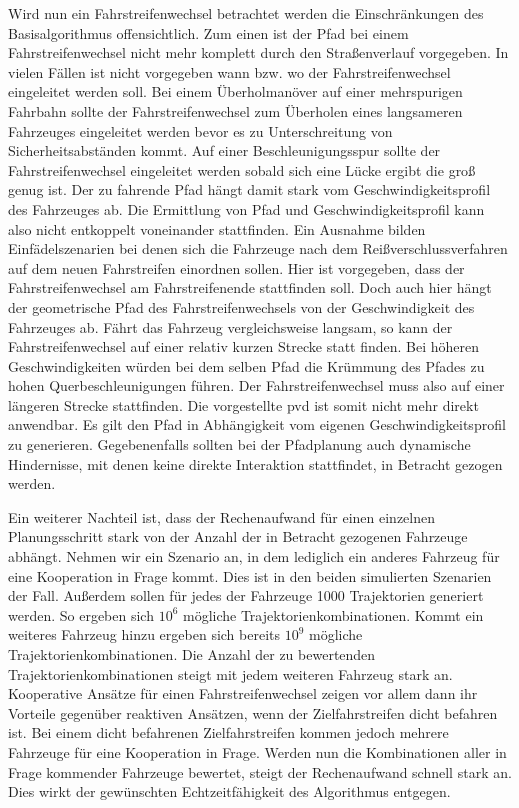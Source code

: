 Wird nun ein Fahrstreifenwechsel betrachtet werden die Einschr\"ankungen des Basisalgorithmus offensichtlich.
Zum einen ist der Pfad bei einem Fahrstreifenwechsel nicht mehr komplett durch den Stra{\ss}enverlauf vorgegeben.
In vielen F\"allen ist nicht vorgegeben wann bzw. wo der Fahrstreifenwechsel eingeleitet werden soll.
Bei einem \"Uberholman\"over auf einer mehrspurigen Fahrbahn sollte der Fahrstreifenwechsel zum \"Uberholen eines langsameren Fahrzeuges eingeleitet werden bevor es zu Unterschreitung von Sicherheitsabst\"anden kommt.
Auf einer Beschleunigungsspur sollte der Fahrstreifenwechsel eingeleitet werden sobald sich eine L\"ucke ergibt die gro{\ss} genug ist.
Der zu fahrende Pfad h\"angt damit stark vom Geschwindigkeitsprofil des Fahrzeuges ab.
Die Ermittlung von Pfad und Geschwindigkeitsprofil kann also nicht entkoppelt voneinander stattfinden.
Ein Ausnahme bilden Einf\"adelszenarien bei denen sich die Fahrzeuge nach dem Rei{\ss}verschlussverfahren auf dem neuen Fahrstreifen einordnen sollen.
Hier ist vorgegeben, dass der Fahrstreifenwechsel am Fahrstreifenende stattfinden soll.
Doch auch hier h\"angt der geometrische Pfad des Fahrstreifenwechsels von der Geschwindigkeit des Fahrzeuges ab.
F\"ahrt das Fahrzeug vergleichsweise langsam, so kann der Fahrstreifenwechsel auf einer relativ kurzen Strecke statt finden.
Bei h\"oheren Geschwindigkeiten w\"urden bei dem selben Pfad die Kr\"ummung des Pfades zu hohen Querbeschleunigungen f\"uhren.
Der Fahrstreifenwechsel muss also auf einer l\"angeren Strecke stattfinden.
Die vorgestellte \gls{pvd} ist somit nicht mehr direkt anwendbar.
Es gilt den Pfad in Abh\"angigkeit vom eigenen Geschwindigkeitsprofil zu generieren.
Gegebenenfalls sollten bei der Pfadplanung auch dynamische Hindernisse, mit denen keine direkte Interaktion stattfindet, in Betracht gezogen werden.

Ein weiterer Nachteil ist, dass der Rechenaufwand f\"ur einen einzelnen Planungsschritt stark von der Anzahl der in Betracht gezogenen Fahrzeuge abh\"angt.
Nehmen wir ein Szenario an, in dem lediglich ein anderes Fahrzeug f\"ur eine Kooperation in Frage kommt.
Dies ist in den beiden simulierten Szenarien der Fall.
Au{\ss}erdem sollen f\"ur jedes der Fahrzeuge 1000 Trajektorien generiert werden.
So ergeben sich \( 10^6 \) m\"ogliche Trajektorienkombinationen.
Kommt ein weiteres Fahrzeug hinzu ergeben sich bereits \( 10^9 \) m\"ogliche Trajektorienkombinationen.
Die Anzahl der zu bewertenden Trajektorienkombinationen steigt mit jedem weiteren Fahrzeug stark an.
Kooperative Ans\"atze f\"ur einen Fahrstreifenwechsel zeigen vor allem dann ihr Vorteile gegen\"uber reaktiven Ans\"atzen, wenn der Zielfahrstreifen dicht befahren ist.
Bei einem dicht befahrenen Zielfahrstreifen kommen jedoch mehrere Fahrzeuge f\"ur eine Kooperation in Frage.
Werden nun die Kombinationen aller in Frage kommender Fahrzeuge bewertet, steigt der Rechenaufwand schnell stark an.
Dies wirkt der gew\"unschten Echtzeitf\"ahigkeit des Algorithmus entgegen.


